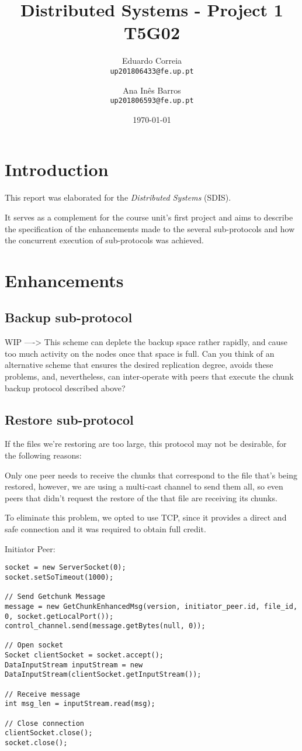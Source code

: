 \documentclass[11pt]{report}
\title{
    \textbf{Distributed Systems - Project 1} \\
    \Large T5G02
}
\author{
    \Large
    Eduardo Correia \\
    \texttt{up201806433@fe.up.pt}
    \and
    \Large
    Ana Inês Barros \\
    \texttt{up201806593@fe.up.pt}
}
\date{\today}
\begin{document}
\maketitle

\chapter{Introduction}

This report was elaborated for the \textit{Distributed Systems} (SDIS).

It serves as a complement for the course unit's first project and aims to describe the specification of the enhancements made to the several sub-protocols and how the concurrent execution of sub-protocols was achieved.

\chapter{Enhancements}

\section{Backup sub-protocol}

WIP ----> This scheme can deplete the backup space rather rapidly, and cause too much activity on the nodes once that space is full. Can you think of an alternative scheme that ensures the desired replication degree, avoids these problems, and, nevertheless, can inter-operate with peers that execute the chunk backup protocol described above?

\newpage

\section{Restore sub-protocol}

If the files we're restoring are too large, this protocol may not be desirable, for the following reasons:

Only one peer needs to receive the chunks that correspond to the file that's being restored, however, we are using a multi-cast channel to send them all, so even peers that didn't request the restore of the that file are receiving its chunks.

To eliminate this problem, we opted to use TCP, since it provides a direct and safe connection and it was required to obtain full credit.

Initiator Peer:

\begin{verbatim}
socket = new ServerSocket(0);
socket.setSoTimeout(1000);

// Send Getchunk Message
message = new GetChunkEnhancedMsg(version, initiator_peer.id, file_id, 0, socket.getLocalPort());
control_channel.send(message.getBytes(null, 0));

// Open socket
Socket clientSocket = socket.accept();
DataInputStream inputStream = new DataInputStream(clientSocket.getInputStream());

// Receive message
int msg_len = inputStream.read(msg);

// Close connection
clientSocket.close();
socket.close();
\end{verbatim}
\end{document}
